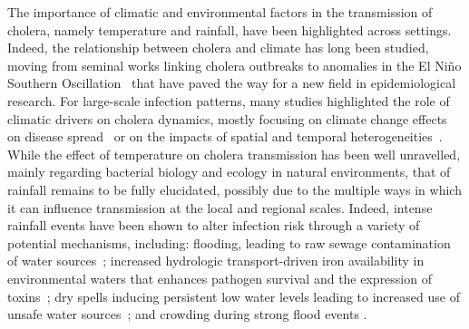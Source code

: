The importance of climatic and environmental factors in the transmission of cholera, namely temperature and rainfall, have been highlighted across settings. Indeed, the relationship between cholera and climate has long been studied, moving from seminal works linking cholera outbreaks to anomalies in the El Ni\~no Southern Oscillation~\cite{colwell96,pascual00} that have paved the way for a new field in epidemiological research. For large-scale infection patterns, many studies highlighted the role of climatic drivers on cholera dynamics, mostly focusing on climate change effects on disease spread~\cite{hashizume08,demagny12,hashizume2013,rodo2013,ramirez2016,vezzulli2016,rinaldo17} or on the impacts of spatial and temporal heterogeneities~\cite{reiner12,baker-austin2013,vezzulli2013,cash2014,escobar2015,vezzulli2015,perezsaez17a}. While the effect of temperature on cholera transmission has been well unravelled, mainly regarding bacterial biology and ecology in natural environments, that of rainfall remains to be fully elucidated, possibly due to the multiple ways in which it can influence transmission at the local and regional scales\cite{Rinaldo:Reassessment20102011:2012,eisenbergExaminingRainfallCholera2013,baracchiniSeasonalityCholeraDynamics2017}. Indeed, intense rainfall events have been shown to alter infection risk through a variety of potential mechanisms, including: flooding, leading to raw sewage contamination of water sources~\cite{ruiz07,hashizume08}; increased hydrologic transport-driven iron availability in environmental waters that enhances pathogen survival and the expression of toxins~\cite{lipp02,faruque2005,hill11}; dry spells inducing persistent low water levels leading to increased use of unsafe water sources~\cite{rebaudet13a}; and crowding during strong flood events \cite{reiner12}.

